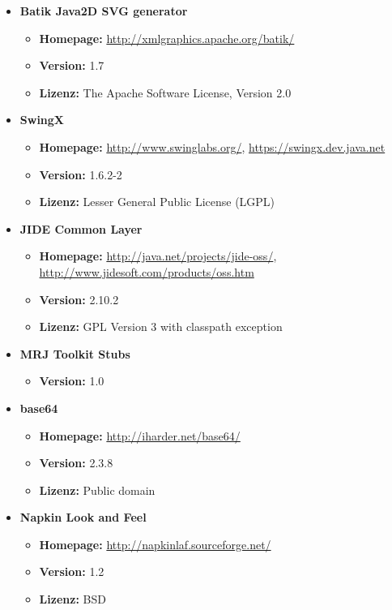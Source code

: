 \documentclass[12pt,a4paper]{scrartcl}
\begin{document}
\begin{itemize}
 \item \textbf{Batik Java2D SVG generator}
    \begin{itemize}
     \item \textbf{Homepage:} \url{http://xmlgraphics.apache.org/batik/}
     \item \textbf{Version:} 1.7
     \item \textbf{Lizenz:} The Apache Software License, Version 2.0
    \end{itemize}

 \item \textbf{SwingX}
    \begin{itemize}
     \item \textbf{Homepage:} \url{http://www.swinglabs.org/}, \url{https://swingx.dev.java.net}
     \item \textbf{Version:} 1.6.2-2
     \item \textbf{Lizenz:} Lesser General Public License (LGPL)
    \end{itemize}

  \item \textbf{JIDE Common Layer}
    \begin{itemize}
     \item \textbf{Homepage:} \url{http://java.net/projects/jide-oss/}, \url{http://www.jidesoft.com/products/oss.htm}
     \item \textbf{Version:} 2.10.2
     \item \textbf{Lizenz:} GPL Version 3 with classpath exception
    \end{itemize}
    
  \item \textbf{MRJ Toolkit Stubs}
    \begin{itemize}
     \item \textbf{Version:} 1.0
    \end{itemize}
    
 \item \textbf{base64}
    \begin{itemize}
     \item \textbf{Homepage:} \url {http://iharder.net/base64/}
     \item \textbf{Version:} 2.3.8
     \item \textbf{Lizenz:} Public domain
    \end{itemize}
    
 \item \textbf{Napkin Look and Feel}
    \begin{itemize}
     \item \textbf{Homepage:} \url {http://napkinlaf.sourceforge.net/}
     \item \textbf{Version:} 1.2
     \item \textbf{Lizenz:} BSD
    \end{itemize}
 

\end{itemize}


%
\newpage
\printglossary
\end{document}

